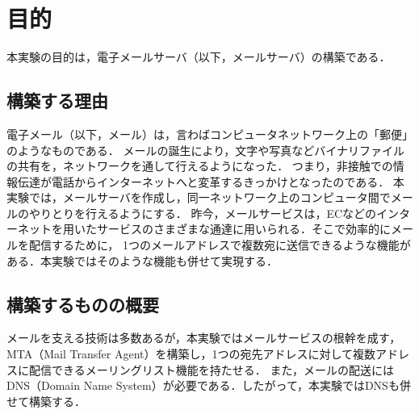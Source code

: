 \section{目的}
本実験の目的は，電子メールサーバ（以下，メールサーバ）の構築である．
\subsection{構築する理由}
電子メール（以下，メール）は，言わばコンピュータネットワーク上の「郵便」のようなものである．
メールの誕生により，文字や写真などバイナリファイルの共有を，ネットワークを通して行えるようになった．
つまり，非接触での情報伝達が電話からインターネットへと変革するきっかけとなったのである．
本実験では，メールサーバを作成し，同一ネットワーク上のコンピュータ間でメールのやりとりを行えるようにする．
昨今，メールサービスは，ECなどのインターネットを用いたサービスのさまざまな通達に用いられる．そこで効率的にメールを配信するために，
1つのメールアドレスで複数宛に送信できるような機能がある．本実験ではそのような機能も併せて実現する．

\subsection{構築するものの概要}
メールを支える技術は多数あるが，本実験ではメールサービスの根幹を成す，MTA（Mail Transfer Agent）を構築し，1つの宛先アドレスに対して複数アドレスに配信できるメーリングリスト機能を持たせる．
また，メールの配送にはDNS（Domain Name System）が必要である．したがって，本実験ではDNSも併せて構築する．